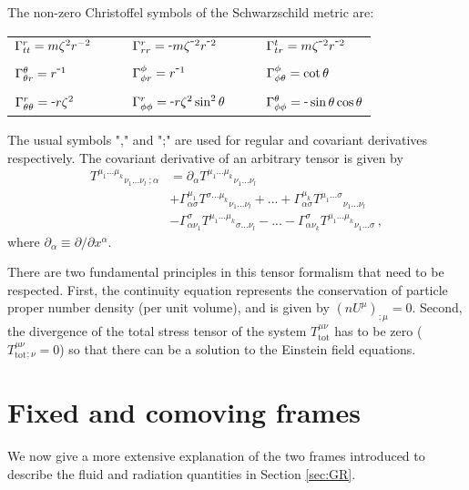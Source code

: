 \documentclass[../main.tex]{subfiles}
\begin{document}
The non-zero Christoffel symbols of the Schwarzschild metric are: 
\begin{center}
    \begin{tabular}{lll}
        $\Gamma^{r}_{tt}=m\zeta^2r^{-2}$ & $\qquad\chris{r}{r}{r}=\-m\zeta^{\-2}r^{\-2}\qquad$ & $\chris{t}{t}{r}=m\zeta^{\-2}r^{\-2}$  \\
        \\
        $\chris{\theta}{\theta}{r}=r^{\-1}$ & $\qquad\chris{\phi}{\phi}{r}=r^{\-1}\qquad$ & $\Gamma^{\phi}_{\phi\theta}=\cot\theta$ \\
        \\
        $\chris{r}{\theta}{\theta}=\-r\zeta^2$ & $\qquad\chris{r}{\phi}{\phi}=\-r\zeta^2\sin^2\theta\qquad$ & $\chris{\theta}{\phi}{\phi}=\-\sin\theta\cos\theta$  \\
    \end{tabular}
\end{center}

The usual symbols "," and ";" are used for regular and covariant derivatives respectively.  The covariant derivative of an arbitrary tensor is given by 
\begin{align*}
T^{\mu_1...\mu_k}{}_{\nu_1...\nu_l\; ;\alpha}&=\partial_\alpha T^{\mu_1...\mu_k}{}_{\nu_1...\nu_l}\\
&+\Gamma^{\mu_1}_{\alpha \sigma}T^{\sigma...\mu_k}{}_{\nu_1...\nu_l}+...+\Gamma^{\mu_k}_{\alpha \sigma}T^{\mu_1...\sigma}{}_{\nu_1...\nu_l}\\
&-\Gamma^{\sigma}_{\alpha \nu_1}T^{\mu_1...\mu_k}{}_{\sigma...\nu_l}-...-\Gamma^{\sigma}_{\alpha \nu_k}T^{\mu_1...\mu_k}{}_{\nu_1...\sigma}\,,
\end{align*}
where $\partial_\alpha\equiv\partial/\partial x^\alpha$.

There are two fundamental principles in this tensor formalism that need to be respected. First, the continuity equation represents the conservation of particle proper number density (per unit volume), and is given by $(nU^\mu)_{;\mu}=0$.   Second, the divergence of the total stress tensor of the system $T^{\mu\nu}_\text{tot}$ has to be zero ($T^{\mu\nu}_\text{tot}{}_{;\nu}=0$) so that there can be a solution to the Einstein field equations.  

\section*{Fixed and comoving frames}
We now give a more extensive explanation of the two frames introduced to describe the fluid and radiation quantities in Section \ref{sec:GR}.
\end{document}
